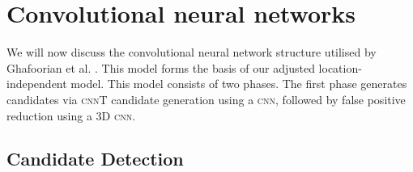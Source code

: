 %
%
%
%
%
%


\section{Convolutional neural networks}\label{litrev-cnn}

We will now discuss the convolutional neural network structure utilised by Ghafoorian et al. \cite{GhafoorianM.2017Dml3}. This model forms the basis of our adjusted location-independent model. This model consists of two phases. The first phase generates candidates via \textsc{cnn}T candidate generation using a \textsc{cnn}, followed by false positive reduction using a 3D \textsc{cnn}.

\subsection*{Candidate Detection}

